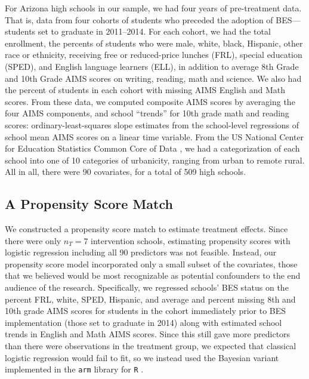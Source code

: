 \documentclass[12pt]{article}\usepackage[]{graphicx}\usepackage[]{color}
\begin{document}
For Arizona high schools in our sample, we had four years of pre-treatment data.
That is, data from four cohorts of students who preceded the adoption
of BES---students set to graduate in 2011--2014.
For each cohort, we had the total enrollment, the percents of students who were male, white, black, Hispanic, other race or ethnicity, receiving free or reduced-price lunches (FRL), special education (SPED), and English language learners (ELL), in addition to average 8th Grade and 10th Grade AIMS scores on writing, reading, math and science.
We also had the percent of students in each cohort with missing AIMS English and Math scores.
From these data, we computed composite AIMS scores by averaging the
four AIMS components, and school ``trends'' for 10th grade math and reading scores: ordinary-least-squares slope estimates from the school-level regressions of school mean AIMS scores on a linear time variable.
From the US National Center for Education Statistics Common Core of
Data \citep{ccd}, we had a categorization of each school into one of 10 categories of urbanicity, ranging from urban to remote rural.
All in all, there were 90 covariates, for a total of 509 high schools.

\subsection{A Propensity Score Match}\label{sec:match}

We constructed a propensity score match to estimate treatment
effects.
Since there were only $n_{T}=7$ intervention schools, estimating
propensity scores with logistic
regression including all 90 predictors was not feasible.
Instead, our propensity score model incorporated only a small subset
of the covariates, those that we believed would be most recognizable
as potential confounders to the end audience of the research.
Specifically, we regressed schools' BES status on the percent FRL, white, SPED, Hispanic, and average and percent missing 8th and 10th grade AIMS scores for students in the cohort immediately prior to BES implementation (those set to graduate in 2014) along with estimated school trends in English and Math AIMS scores.
Since this still gave more predictors than there were observations in
the treatment group, we expected that classical logistic regression
would fail to fit, so we instead used the Bayesian variant implemented in the \texttt{arm}
library for \texttt{R} \citep{arm,gelman2008weakly}.
\end{document}
